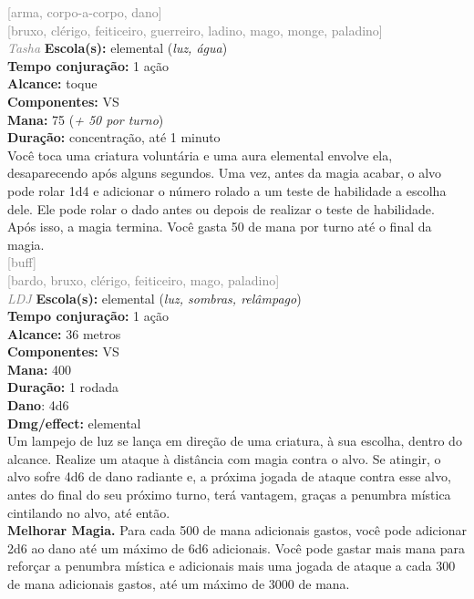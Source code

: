 \documentclass{RPG_Adventure}[2021/10/20]
\begin{document}
{\scriptsize \textcolor{gray}{[arma, corpo-a-corpo, dano]\\}}
{\scriptsize \textcolor{gray}{[bruxo, clérigo, feiticeiro, guerreiro, ladino, mago, monge, paladino]\\}}
{\tiny \textcolor{gray}{\textit{Tasha}}}
{\small \t \textbf{Escola(s):} elemental (\textit{luz, água})\\\t \textbf{Tempo conjuração:} 1 ação\\\t \textbf{Alcance:} toque\\\t \textbf{Componentes:} VS\\\t \textbf{Mana:} 75 (\textit{+ 50 por turno})\\\t \textbf{Duração:} concentração, até 1 minuto\\}
{\normalsize Você toca uma criatura voluntária e uma aura elemental envolve ela, desaparecendo após alguns segundos. Uma vez, antes da magia acabar, o alvo pode rolar 1d4 e adicionar o número rolado a um teste de habilidade a escolha dele. Ele pode rolar o dado antes ou depois de realizar o teste de habilidade. Após isso, a magia termina. Você gasta 50 de mana por turno até o final da magia.\\}
{\scriptsize \textcolor{gray}{[buff]\\}}
{\scriptsize \textcolor{gray}{[bardo, bruxo, clérigo, feiticeiro, mago, paladino]\\}}
{\tiny \textcolor{gray}{\textit{LDJ}}}
{\small \t \textbf{Escola(s):} elemental (\textit{luz, sombras, relâmpago})\\\t \textbf{Tempo conjuração:} 1 ação\\\t \textbf{Alcance:} 36 metros\\\t \textbf{Componentes:} VS\\\t \textbf{Mana:} 400\\\t \textbf{Duração:} 1 rodada\\\t \textbf{Dano}: 4d6\\\t \textbf{Dmg/effect:} elemental\\}
{\normalsize Um lampejo de luz se lança em direção de uma criatura, à sua escolha, dentro do alcance. Realize um ataque à distância com magia contra o alvo. Se atingir, o alvo sofre 4d6 de dano radiante e, a próxima jogada de ataque contra esse alvo, antes do final do seu próximo turno, terá vantagem, graças a penumbra mística cintilando no alvo, até então.\\\t \textbf{Melhorar Magia.} Para cada 500 de mana adicionais gastos, você pode adicionar 2d6 ao dano até um máximo de 6d6 adicionais. Você pode gastar mais mana para reforçar a penumbra mística e adicionais mais uma jogada de ataque a cada 300 de mana adicionais gastos, até um máximo de 3000 de mana.\\}
\end{document}
